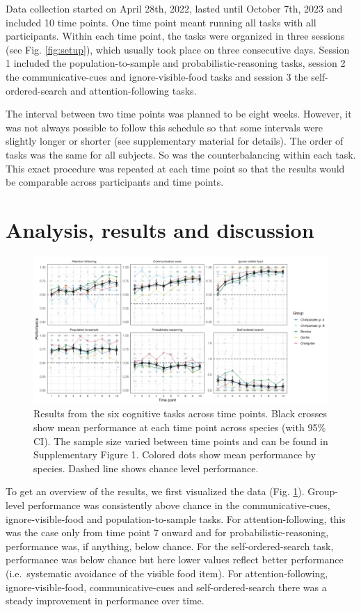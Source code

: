\documentclass[
  man,floatsintext]{apa6}
\begin{document}
Data collection started on April 28th, 2022, lasted until October 7th, 2023 and included 10 time points. One time point meant running all tasks with all participants. Within each time point, the tasks were organized in three sessions (see Fig. \ref{fig:setup}), which usually took place on three consecutive days. Session 1 included the population-to-sample and probabilistic-reasoning tasks, session 2 the communicative-cues and ignore-visible-food tasks and session 3 the self-ordered-search and attention-following tasks.

The interval between two time points was planned to be eight weeks. However, it was not always possible to follow this schedule so that some intervals were slightly longer or shorter (see supplementary material for details). The order of tasks was the same for all subjects. So was the counterbalancing within each task. This exact procedure was repeated at each time point so that the results would be comparable across participants and time points.

\section{Analysis, results and discussion}\label{analysis-results-and-discussion}

\begin{figure}
\includegraphics[width=1\linewidth]{../visuals/perf} \caption{Results from the six cognitive tasks across time points. Black crosses show mean performance at each time point across species (with 95\% CI). The sample size varied between time points and can be found in Supplementary Figure 1. Colored dots show mean performance by species. Dashed line shows chance level performance.}\label{fig:perfplot}
\end{figure}

To get an overview of the results, we first visualized the data (Fig. \ref{fig:perfplot}). Group-level performance was consistently above chance in the communicative-cues, ignore-visible-food and population-to-sample tasks. For attention-following, this was the case only from time point 7 onward and for probabilistic-reasoning, performance was, if anything, below chance. For the self-ordered-search task, performance was below chance but here lower values reflect better performance (i.e.~systematic avoidance of the visible food item). For attention-following, ignore-visible-food, communicative-cues and self-ordered-search there was a steady improvement in performance over time.
\end{document}
